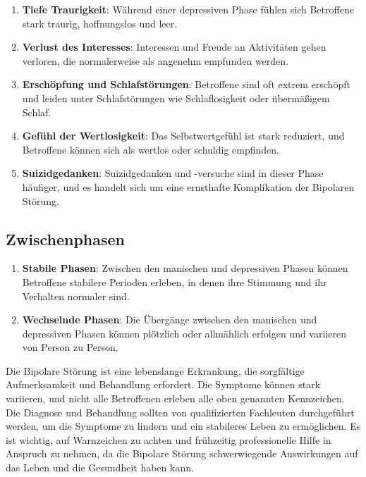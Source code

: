 \begin{enumerate}
\item \textbf{Tiefe Traurigkeit}: Während einer depressiven Phase fühlen sich Betroffene stark traurig, hoffnungslos und leer.

\item \textbf{Verlust des Interesses}: Interessen und Freude an Aktivitäten gehen verloren, die normalerweise als angenehm empfunden werden.

\item \textbf{Erschöpfung und Schlafstörungen}: Betroffene sind oft extrem erschöpft und leiden unter Schlafstörungen wie Schlaflosigkeit oder übermäßigem Schlaf.

\item \textbf{Gefühl der Wertlosigkeit}: Das Selbstwertgefühl ist stark reduziert, und Betroffene können sich als wertlos oder schuldig empfinden.

\item \textbf{Suizidgedanken}: Suizidgedanken und -versuche sind in dieser Phase häufiger, und es handelt sich um eine ernsthafte Komplikation der Bipolaren Störung.
\end{enumerate}

\subsection{Zwischenphasen}

\begin{enumerate}
\item \textbf{Stabile Phasen}: Zwischen den manischen und depressiven Phasen können Betroffene stabilere Perioden erleben, in denen ihre Stimmung und ihr Verhalten normaler sind.

\item \textbf{Wechselnde Phasen}: Die Übergänge zwischen den manischen und depressiven Phasen können plötzlich oder allmählich erfolgen und variieren von Person zu Person.
\end{enumerate}

Die Bipolare Störung ist eine lebenslange Erkrankung, die sorgfältige Aufmerksamkeit und Behandlung erfordert. Die Symptome können stark variieren, und nicht alle Betroffenen erleben alle oben genannten Kennzeichen. Die Diagnose und Behandlung sollten von qualifizierten Fachleuten durchgeführt werden, um die Symptome zu lindern und ein stabileres Leben zu ermöglichen. Es ist wichtig, auf Warnzeichen zu achten und frühzeitig professionelle Hilfe in Anspruch zu nehmen, da die Bipolare Störung schwerwiegende Auswirkungen auf das Leben und die Gesundheit haben kann.


